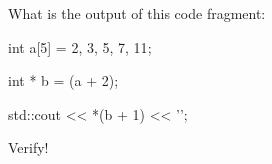 What is the output of this code fragment:



\begin{consolethree}[escapeinside=||]

int a[5] = {2, 3, 5, 7, 11};

int * b = (a + 2);

std::cout << *(b + 1) << '\n';

\end{consolethree}



Verify!


